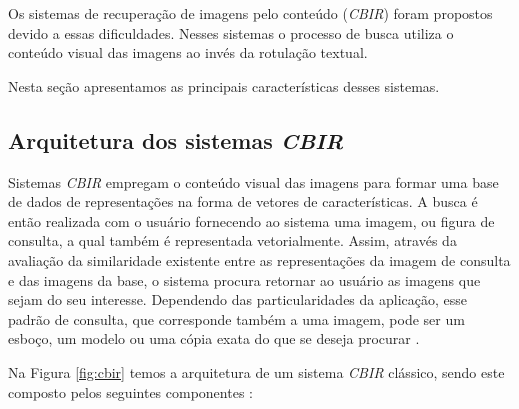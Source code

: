 Os sistemas de recuperação de imagens pelo conteúdo (\emph{CBIR}) foram propostos devido a essas dificuldades. Nesses sistemas o processo de busca utiliza o conteúdo visual das imagens ao invés da rotulação textual. 

Nesta seção apresentamos as principais características desses sistemas.

\subsection{Arquitetura dos sistemas \emph{CBIR}}

Sistemas \emph{CBIR} empregam o conteúdo visual das imagens para formar uma base de dados de representações na forma de vetores de características. A busca é então realizada com o usuário fornecendo ao sistema uma imagem, ou figura de consulta, a qual também é representada vetorialmente. Assim, através da avaliação da similaridade existente entre as representações da imagem de consulta e das imagens da base, o sistema procura retornar ao usuário as imagens que sejam do seu interesse. Dependendo das particularidades da aplicação, esse padrão de consulta, que corresponde também a uma imagem, pode ser um esboço, um modelo ou uma cópia exata do que se deseja procurar \cite{Smeulders:2000}.

\begin{comment}
Sistemas \emph{CBIR} realizam buscas em bases multimídia utilizando o conteúdo visual das imagens, visando recuperar imagens que sejam do interesse do usuário mediante um padrão de consulta especificado. O campo das pesquisas em recuperação de imagens pelo conteúdo é vasto e relativamente recente.
\end{comment}


Na Figura \ref{fig:cbir} temos a arquitetura de um sistema \emph{CBIR} clássico, sendo este composto pelos seguintes componentes \cite{Torres:2006}:

